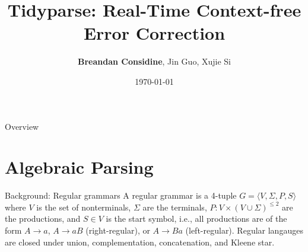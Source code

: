 \documentclass{beamer}
\title[Tidyparse: Real-Time Context-free Error Correction]{Tidyparse: Real-Time Context-free Error Correction}
\author[Considine, Guo, Si]{\textbf{Breandan Considine}, Jin Guo, Xujie Si}
\institute[McGill]{
    McGill University, Mila IQIA\\
    \medskip
    \textit{bre@ndan.co}
}
\date{\today}
\begin{document}
    \begin{frame}
        \titlepage
    \end{frame}

    \begin{frame}{Overview}
        \tableofcontents
    \end{frame}

    
    \section{Algebraic Parsing}\label{sec:algebraic-parsing}


    \begin{frame}{Background: Regular grammars}
        A regular grammar is a 4-tuple $G = \langle V, \Sigma, P, S\rangle$ where $V$ is the set of nonterminals, $\Sigma$ are the terminals, $P: V\times (V \cup \Sigma)^{\leq 2}$ are the productions, and $S\in V$ is the start symbol, i.e., all productions are of the form $A \rightarrow a$, $A \rightarrow a B$ (right-regular), or $A \rightarrow B a$ (left-regular). Regular langauges are closed under union, complementation, concatenation, and Kleene star.


\end{frame}
\end{document}
